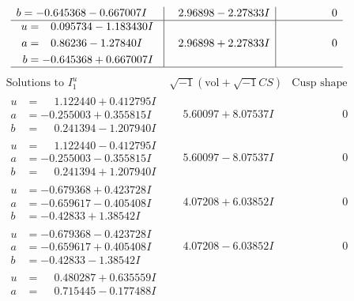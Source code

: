 \documentclass[1p]{elsarticle_modified}
\theoremstyle{definition}
\newcommand{\I}{\sqrt{-1}}
\begin{document}
$$\begin{array}{c|c|c}
\begin{aligned}
b &= -0.645368 - 0.667007 I\end{aligned}
 & \phantom{-}2.96898 - 2.27833 I & \phantom{-0.000000 } 0 \\ \hline\begin{aligned}
u &= \phantom{-}0.095734 - 1.183430 I \\
a &= \phantom{-}0.86236 - 1.27840 I \\
b &= -0.645368 + 0.667007 I\end{aligned}
 & \phantom{-}2.96898 + 2.27833 I & \phantom{-0.000000 } 0\\
 \hline 
 \end{array}$$\newpage$$\begin{array}{c|c|c}  
\text{Solutions to }I^u_{1}& \I (\text{vol} + \sqrt{-1}CS) & \text{Cusp shape}\\
 \hline 
\begin{aligned}
u &= \phantom{-}1.122440 + 0.412795 I \\
a &= -0.255003 + 0.355815 I \\
b &= \phantom{-}0.241394 - 1.207940 I\end{aligned}
 & \phantom{-}5.60097 + 8.07537 I & \phantom{-0.000000 } 0 \\ \hline\begin{aligned}
u &= \phantom{-}1.122440 - 0.412795 I \\
a &= -0.255003 - 0.355815 I \\
b &= \phantom{-}0.241394 + 1.207940 I\end{aligned}
 & \phantom{-}5.60097 - 8.07537 I & \phantom{-0.000000 } 0 \\ \hline\begin{aligned}
u &= -0.679368 + 0.423728 I \\
a &= -0.659617 - 0.405408 I \\
b &= -0.42833 + 1.38542 I\end{aligned}
 & \phantom{-}4.07208 + 6.03852 I & \phantom{-0.000000 } 0 \\ \hline\begin{aligned}
u &= -0.679368 - 0.423728 I \\
a &= -0.659617 + 0.405408 I \\
b &= -0.42833 - 1.38542 I\end{aligned}
 & \phantom{-}4.07208 - 6.03852 I & \phantom{-0.000000 } 0 \\ \hline\begin{aligned}
u &= \phantom{-}0.480287 + 0.635559 I \\
a &= \phantom{-}0.715445 - 0.177488 I \\

\end{aligned}
\end{array}$$
\end{document}

